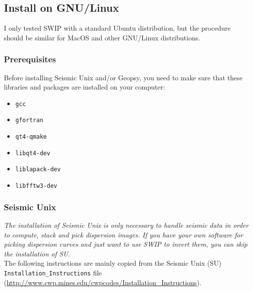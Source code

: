 \documentclass[twoside,a4paper]{article}
\begin{document}
\subsection{Install on GNU/Linux}
I only tested SWIP with a standard Ubuntu distribution, but the procedure should be similar for MacOS and other GNU/Linux distributions.
\subsubsection{Prerequisites}
Before installing Seismic Unix and/or Geopsy, you need to make sure that these libraries and packages are installed on your computer:

\begin{itemize}
\item \verb|gcc|
\item \verb|gfortran|
\item \verb|qt4-qmake|
\item \verb|libqt4-dev|
\item \verb|liblapack-dev|
\item \verb|libfftw3-dev|

\end{itemize}
\subsubsection{Seismic Unix}
\textit{The installation of Seismic Unix is only necessary to handle seismic data in order to compute, stack and pick dispersion images. If you have your own software for picking dispersion curves and just want to use SWIP to invert them, you can skip the installation of SU.}\\[2ex]
The following instructions are mainly copied from the Seismic Unix (SU) \verb|Installation_Instructions| file (\url{http://www.cwp.mines.edu/cwpcodes/Installation_Instructions}).
\end{document}

